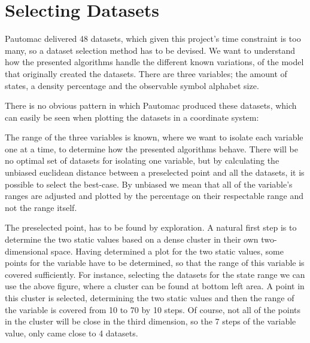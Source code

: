 \section{Selecting Datasets}
Pautomac delivered 48 datasets, which given this project's time constraint is too many, so a dataset selection method has to be devised. We want to understand how the presented algorithms handle the different known variations, of the model that originally created the datasets. There are three variables; the amount of states, a density percentage and the observable symbol alphabet size.

There is no obvious pattern in which Pautomac produced these datasets, which can easily be seen when plotting the datasets in a coordinate system:


The range of the three variables is known, where we want to isolate each variable one at a time, to determine how the presented algorithms behave. There will be no optimal set of datasets for isolating one variable, but by calculating the unbiased euclidean distance between a preselected point and all the datasets, it is possible to select the best-case. By unbiased we mean that all of the variable's ranges are adjusted and plotted by the percentage on their respectable range and not the range itself. 

The preselected point, has to be found by exploration. A natural first step is to determine the two static values based on a dense cluster in their own two-dimensional space. Having determined a plot for the two static values, some points for the variable have to be determined, so that the range of this variable is covered sufficiently. For instance, selecting the datasets for the state range we can use the above figure, where a cluster can be found at bottom left area. A point in this cluster is selected, determining the two static values and then the range of the variable is covered from 10 to 70 by 10 steps. Of course, not all of the points in the cluster will be close in the third dimension, so the 7 steps of the variable value, only came close to 4 datasets. 

